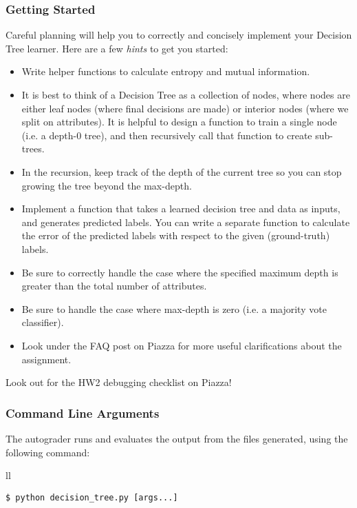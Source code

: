 \documentclass[11pt,addpoints,answers]{exam}
\begin{document}
\subsubsection{Getting Started}

Careful planning will help you to correctly and concisely implement your Decision Tree learner. Here are a few \emph{hints} to get you started:
\begin{itemize}
    \item Write helper functions to calculate entropy and mutual information.
    \item It is best to think of a Decision Tree as a collection of nodes, where nodes are either leaf nodes (where final decisions are made) or interior nodes (where we split on attributes). It is helpful to design a function to train a single node (i.e. a depth-0 tree), and then recursively call that function to create sub-trees.
    \item In the recursion, keep track of the depth of the current tree so you can stop growing the tree beyond the max-depth.
    \item Implement a function that takes a learned decision tree and data as inputs, and generates predicted labels. You can write a separate function to calculate the error of the predicted labels with respect to the given (ground-truth) labels.
    \item Be sure to correctly handle the case where the specified maximum depth is greater than the total number of attributes.
    \item Be sure to handle the case where max-depth is zero (i.e. a majority vote classifier). 
    \item Look under the FAQ post on Piazza for more useful clarifications about the assignment.
\end{itemize}

\begin{notebox}
Look out for the HW2 debugging checklist on Piazza!
\end{notebox}

\subsubsection{Command Line Arguments}

The autograder runs and evaluates the output from the files  generated, using the following command:

\begin{tabular}{ll}
\begin{lstlisting}[language=Shell]
$ python decision_tree.py [args...]
\end{lstlisting}
\end{tabular}
\end{document}
